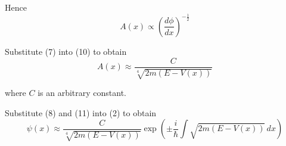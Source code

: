 Hence
\begin{equation*}
A(x)\propto\left(\frac{d\phi}{dx}\right)^{-\frac{1}{2}}
\tag{10}
\end{equation*}

Substitute (7) into (10) to obtain
\begin{equation*}
A(x)\approx\frac{C}{\sqrt[4]{2m(E-V(x))}}
\tag{11}
\end{equation*}

where $C$ is an arbitrary constant.

\bigskip
Substitute (8) and (11) into (2) to obtain
\begin{equation*}
\psi(x)\approx\frac{C}{{\sqrt[4]{2m(E-V(x))}}}
\exp\left(\pm\frac{i}{\hbar}\int\sqrt{2m(E-V(x))}\,dx\right)
\end{equation*}



